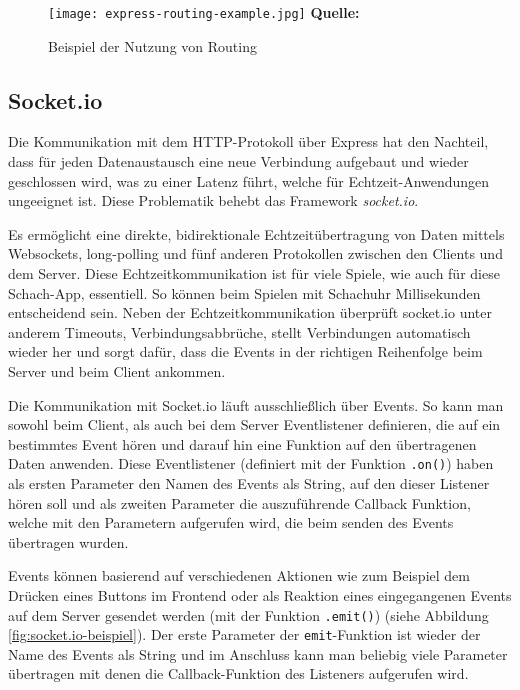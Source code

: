   \begin{figure}[ht]
  \centering
  \texttt{[image: express-routing-example.jpg]}
\raggedleft
    \footnotesize\sffamily\textbf{Quelle:} \cite{expressbook}
  \caption{Beispiel der Nutzung von Routing}
  \label{fig:routing-beispiel}
\end{figure}

        \subsection{Socket.io}
        \label{sec:socket.io}
Die Kommunikation mit dem HTTP-Protokoll über Express hat den Nachteil, dass für jeden Datenaustausch eine neue Verbindung aufgebaut und wieder geschlossen wird, was zu einer Latenz führt, welche für Echtzeit-Anwendungen ungeeignet ist. Diese Problematik behebt das Framework \textit{socket.io}. %

Es ermöglicht eine direkte, bidirektionale Echtzeitübertragung von Daten mittels Websockets, long-polling und fünf anderen Protokollen zwischen den Clients und dem Server. Diese Echtzeitkommunikation ist für viele Spiele, wie auch für diese Schach-App, essentiell. So können beim Spielen mit Schachuhr Millisekunden entscheidend sein.
Neben der Echtzeitkommunikation überprüft socket.io unter anderem Timeouts, Verbindungsabbrüche, stellt Verbindungen automatisch wieder her und sorgt dafür, dass die Events in der richtigen Reihenfolge beim Server und beim Client ankommen. 

Die Kommunikation mit Socket.io läuft ausschließlich über Events. So kann man sowohl beim Client, als auch bei dem Server Eventlistener definieren, die auf ein bestimmtes Event hören und darauf hin eine Funktion auf den übertragenen Daten anwenden. Diese Eventlistener (definiert mit der Funktion \verb|.on()|) haben als ersten Parameter den Namen des Events als String, auf den dieser Listener hören soll und als zweiten Parameter die auszuführende Callback Funktion, welche mit den Parametern aufgerufen wird, die beim senden des Events übertragen wurden.

Events können basierend auf verschiedenen Aktionen wie zum Beispiel dem Drücken eines Buttons im Frontend oder als Reaktion eines eingegangenen Events auf dem Server gesendet werden (mit der Funktion \verb|.emit()|) (siehe Abbildung \ref{fig:socket.io-beispiel}). Der erste Parameter der \verb|emit|-Funktion ist wieder der Name des Events als String und im Anschluss kann man beliebig viele Parameter übertragen mit denen die Callback-Funktion des Listeners aufgerufen wird.


